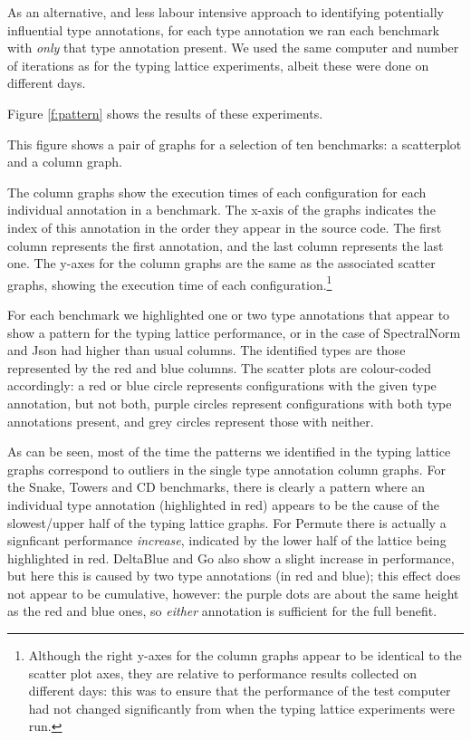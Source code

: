 \documentclass[sigplan,10pt,review,screen]{acmart}\settopmatter{printfolios=true}
\begin{document}
As an alternative, and less labour intensive approach to identifying potentially influential type annotations, for each type annotation we ran each benchmark with \textit{only} that type annotation present. We used the same computer and number of iterations as for the typing lattice experiments, albeit these were done on different days.


Figure \ref{f:pattern} shows the results of these experiments.

This figure shows a pair of graphs for a selection of ten benchmarks: a scatterplot and a column graph.

The column graphs show the execution times of each configuration for each individual annotation in a benchmark. The x-axis of the graphs indicates the index of this annotation in the order they appear in the source code. The first column represents the first annotation, and the last column represents the last one. The y-axes for the column graphs are the same as the associated scatter graphs, showing the execution time of each configuration.\footnote{Although the right y-axes for the column graphs appear to be identical to the scatter plot axes, they are relative to performance results collected on different days: this was to ensure that the performance of the test computer had not changed significantly from when the typing lattice experiments were run.}

For each benchmark we highlighted one or two type annotations that appear to show a pattern for the typing lattice performance, or in the case of SpectralNorm and Json had higher than usual columns. The identified types are those represented by the red and blue columns. The scatter plots are colour-coded accordingly: a red or blue circle represents configurations with the given type annotation, but not both, purple circles represent configurations with both type annotations present, and grey circles represent those with neither.

As can be seen, most of the time the patterns we identified in the typing lattice graphs correspond to outliers in the single type annotation column graphs. For the Snake, Towers and CD benchmarks, there is clearly a pattern where an individual type annotation (highlighted in red) appears to be the cause of the slowest/upper half of the typing lattice graphs. For Permute there is actually a signficant performance \emph{increase}, indicated by the lower half of the lattice being highlighted in red. DeltaBlue and Go also show a slight increase in performance, but here this is caused by two type annotations (in red and blue); this effect does not appear to be cumulative, however: the purple dots are about the same height as the red and blue ones, so \textit{either} annotation is sufficient for the full benefit.
\end{document}

